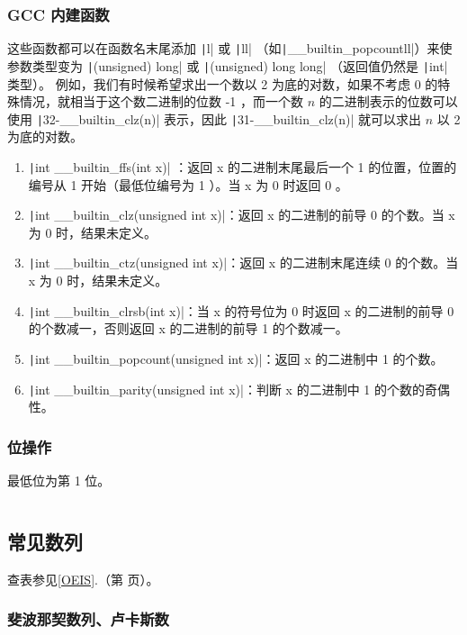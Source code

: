 \documentclass[a4paper, twoside]{article}
\newcommand\detailedref[1]{\ref{#1}.\nameref{#1}（第 \pageref{#1} 页）}
\begin{document}
    \subsubsection{GCC 内建函数}
    这些函数都可以在函数名末尾添加 \texttt|l| 或 \texttt|ll| （如\texttt|__builtin_popcountll|）来使参数类型变为 \texttt|(unsigned) long| 或 \texttt|(unsigned) long long| （返回值仍然是 \texttt|int| 类型）。 例如，我们有时候希望求出一个数以 2 为底的对数，如果不考虑 0 的特殊情况，就相当于这个数二进制的位数 -1 ，而一个数 $n$ 的二进制表示的位数可以使用 \texttt|32-__builtin_clz(n)| 表示，因此 \texttt|31-__builtin_clz(n)| 就可以求出 $n$ 以 2 为底的对数。
    \begin{enumerate}
        \item \texttt|int __builtin_ffs(int x)| ：返回 x 的二进制末尾最后一个 1 的位置，位置的编号从 1 开始（最低位编号为 1 ）。当 x 为 0 时返回 0 。
        \item \texttt|int __builtin_clz(unsigned int x)|：返回 x 的二进制的前导 0 的个数。当 x 为 0 时，结果未定义。
        \item \texttt|int __builtin_ctz(unsigned int x)|：返回 x 的二进制末尾连续 0 的个数。当 x 为 0 时，结果未定义。
        \item \texttt|int __builtin_clrsb(int x)|：当 x 的符号位为 0 时返回 x 的二进制的前导 0 的个数减一，否则返回 x 的二进制的前导 1 的个数减一。
        \item \texttt|int __builtin_popcount(unsigned int x)|：返回 x 的二进制中 1 的个数。
        \item \texttt|int __builtin_parity(unsigned int x)|：判断 x 的二进制中 1 的个数的奇偶性。
    \end{enumerate}

    \subsubsection{位操作}
    最低位为第 1 位。
    \inputminted{cpp}{../src/数学/二进制相关.cpp}
    
\subsection{常见数列}
查表参见\detailedref{OEIS}。
    \subsubsection{斐波那契数列、卢卡斯数}
\end{document}
